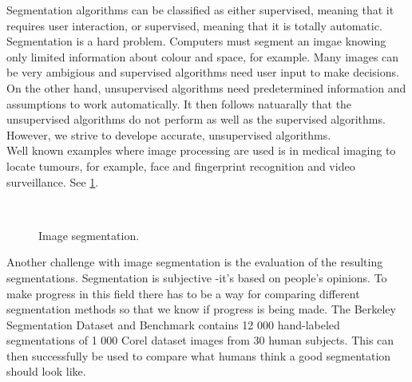 \documentclass[a4paper,10pt]{article}
\begin{document}
Segmentation algorithms can be classified as either supervised, meaning that it
requires user interaction, or supervised, meaning that it is totally
automatic.  Segmentation is a hard problem.  Computers must segment an imgae
knowing only limited information about colour and space, for example.
Many images can be very ambigious and supervised algorithms need user input to
make decisions.  On the other hand, unsupervised algorithms need predetermined
information and assumptions to work automatically.
It then follows natuarally that the unsupervised algorithms do not perform as
well as the supervised algorithms.  However, we strive to develope accurate,
unsupervised algorithms. \\

Well known examples where image processing are used is
in medical imaging to locate tumours, for example, face and
fingerprint recognition and video surveillance.  See \ref{examples}.

\begin{figure}[H]
\centering
\mbox{ \quad
{}}
\caption{Image segmentation.}
\label{examples}
\end{figure}


Another challenge with image segmentation is the evaluation of the resulting
segmentations. Segmentation is subjective -it’s based on people's opinions. 
To make progress in this field there has to be a way for comparing different
segmentation methods so that we know if progress is being made. 
The Berkeley Segmentation Dataset and Benchmark contains 12 000 hand-labeled
segmentations of 1 000 Corel dataset images from 30 human subjects. 
This can then successfully be used to compare what humans think a good
segmentation should look like. \\
\end{document}
